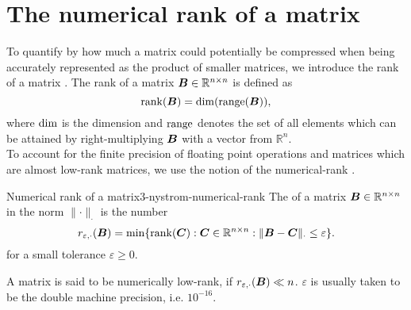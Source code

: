 
\section{The numerical rank of a matrix}
\label{sec:3-nystrom-numerical-rank}

To quantify by how much a matrix could potentially be compressed when being accurately
represented as the product of smaller matrices, we introduce the rank of a
matrix \cite[section~III.3]{hefferon2012linear}.
The rank of a matrix $\boldsymbol{B} \in \mathbb{R}^{n \times n}$ is defined as
\begin{equation}
    \operatorname{rank}(\boldsymbol{B}) = \operatorname{dim}(\operatorname{range}(\boldsymbol{B})),
    \label{equ:3-nystrom-rank}
\end{equation}
where $\operatorname{dim}$ is the dimension and $\operatorname{range}$ denotes the set of all elements
which can be attained by right-multiplying $\boldsymbol{B}$ with a vector from $\mathbb{R}^n$.\\

To account for the finite precision of floating point operations
and matrices which are almost low-rank matrices, we use the
notion of the \gls{numerical-rank} \cite[definition~1.1]{noga2013rank}.
\begin{definition}{Numerical rank of a matrix}{3-nystrom-numerical-rank}
    The  of a matrix $\boldsymbol{B} \in \mathbb{R}^{n \times n}$
    in the norm $\lVert \cdot \rVert _{\cdot}$ is the number
    \begin{equation}
        r_{\varepsilon, \cdot}(\boldsymbol{B}) = \min \{\operatorname{rank}(\boldsymbol{C}): \boldsymbol{C} \in \mathbb{R}^{n \times n}: \lVert \boldsymbol{B} - \boldsymbol{C} \rVert _{\cdot} \leq \varepsilon \}.
        \label{equ:3-nystrom-def-numerical-rank}
    \end{equation}
    for a small tolerance $\varepsilon \geq 0$.
\end{definition}%
A matrix is said to be numerically low-rank, if $r_{\varepsilon, \cdot}(\boldsymbol{B}) \ll n$.
$\varepsilon$ is usually taken to be the double machine precision, i.e. $10^{-16}$.\\

